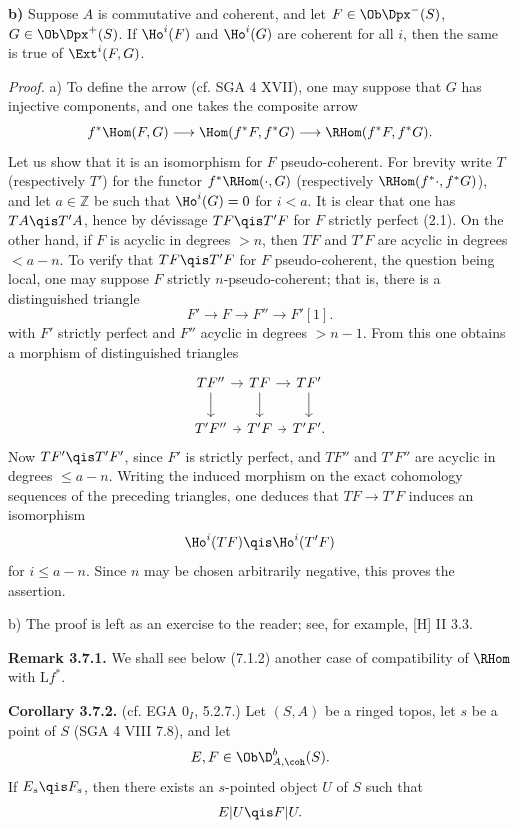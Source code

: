 \documentclass[11pt]{article}
\begin{document}
\textbf{b)} Suppose \(A\) is commutative and coherent, and let \(F\in\Ob\Dpx^-(S)\), \(G\in\Ob\Dpx^+(S)\). If \(\Ho^i(F)\) and \(\Ho^i(G)\) are coherent for all \(i\), then the same is true of \(\Ext^i(F,G)\).

\emph{Proof.} a) To define the arrow (cf. SGA 4 XVII), one may suppose that \(G\) has injective components, and one takes the composite arrow
\[
  f^*\Hom(F,G)\longrightarrow \Hom(f^*F,f^*G)
  \longrightarrow \RHom(f^*F,f^*G).
\]
Let us show that it is an isomorphism for \(F\) pseudo-coherent. For brevity write \(T\) (respectively \(T'\)) for the functor \(f^*\RHom(\cdot,G)\) (respectively \(\RHom(f^*\cdot,f^*G)\)), and let \(a\in\mathbb Z\) be such that \(\Ho^i(G)=0\) for \(i<a\). It is clear that one has \(TA\qis T'A\), hence by dévissage \(TF\qis T'F\) for \(F\) strictly perfect (2.1). On the other hand, if \(F\) is acyclic in degrees \(>n\), then \(TF\) and \(T'F\) are acyclic in degrees \(<a-n\). To verify that \(TF\qis T'F\) for \(F\) pseudo-coherent, the question being local, one may suppose \(F\) strictly \(n\)-pseudo-coherent; that is, there is a distinguished triangle
\[
  F'\longrightarrow F\longrightarrow F''\longrightarrow F'[1].
\]
with \(F'\) strictly perfect and \(F''\) acyclic in degrees \(>n-1\). From this one obtains a morphism of distinguished triangles
\[
\begin{tikzcd}[column sep=tiny]
TF'' \arrow[r] \arrow[d] & TF \arrow[r] \arrow[d] & TF' \arrow[d] \\
T'F'' \arrow[r] & T'F \arrow[r] & T'F' .
\end{tikzcd}
\]
Now \(TF'\qis T'F'\), since \(F'\) is strictly perfect, and \(TF''\) and \(T'F''\) are acyclic in degrees \(\leq a-n\). Writing the induced morphism on the exact cohomology sequences of the preceding triangles, one deduces that \(TF\to T'F\) induces an isomorphism
\[
  \Ho^i(TF)\qis \Ho^i(T'F)
\]
for \(i\leq a-n\). Since \(n\) may be chosen arbitrarily negative, this proves the assertion.

b) The proof is left as an exercise to the reader; see, for example, [H] II 3.3.

\textbf{Remark 3.7.1.} We shall see below (7.1.2) another case of compatibility of \(\RHom\) with \(\mathrm L f^*\).

\textbf{Corollary 3.7.2.} (cf. EGA \(0_I\), 5.2.7.) Let \((S,A)\) be a ringed topos, let \(s\) be a point of \(S\) (SGA 4 VIII 7.8), and let
\[
  E,F\in\Ob\D^b_{A,\coh}(S).
\]
If \(E_s\qis F_s\), then there exists an \(s\)-pointed object \(U\) of \(S\) such that
\[
  E|U\qis F|U.
\]
\end{document}
